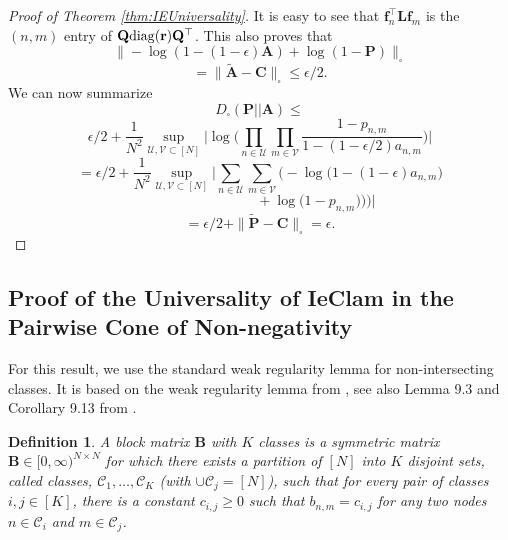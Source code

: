 \documentclass[letterpaper]{article} %
\newtheorem{definition}[theorem]{Definition}
\begin{document}
\begin{proof}[Proof of Theorem \ref{thm:IEUniversality}]
It is easy to see that $\mathbf{f}_n^\top\mathbf{L}\mathbf{f}_m$ is the $(n,m)$ entry of $\mathbf{Q}{\rm diag}(\mathbf{r})\mathbf{Q}^{\top }$. 
This also proves that
\[\|-\log(1-(1-\epsilon)\mathbf{A})+\log(1-\mathbf{P})\|_{\square}\]
\[=\|\tilde{\mathbf{A}}-\mathbf{C}\|_{\square} \leq \epsilon/2.\] 
%
We can now summarize
\[D_{\square}(\mathbf{P}||\mathbf{A}) \leq \]
\[\epsilon/2+\frac{1}{N^2}\sup_{\mathcal{U},\mathcal{V}\subset[N]}\Big|\log\Big(\prod_{n\in \mathcal{U}}\prod_{m\in \mathcal{V}}
\frac{1-p_{n,m}}{1-(1-\epsilon/2)a_{n,m}}\Big)\Big|\]
\[ =
\epsilon/2+\frac{1}{N^2}\sup_{\mathcal{U},\mathcal{V}\subset[N]}\Big|\sum_{n\in \mathcal{U}}\sum_{m\in \mathcal{V}}\Big(-\log\big(1-(1-\epsilon)a_{n,m}\big) \]
\[\quad \quad \quad \quad\quad \quad \quad \quad + \log\big(1-p_{n,m})\big)\Big)\Big|\]
\[=\epsilon/2 + \| \tilde{\mathbf{P}}-\mathbf{C} \|_{\square} = \epsilon. \]
   
\end{proof}


\subsection{Proof of the Universality of IeClam in the Pairwise Cone of Non-negativity}
\label{Proof of the Universality of IeClam in a Cone of Non-negativity}

For this result, we use the standard weak regularity lemma for non-intersecting classes.  It is based on the weak regularity lemma from \cite{weakReg,Szemeredi_analyst}, see also Lemma 9.3 and Corollary 9.13 from \cite{cut-homo3}.

\begin{definition}
    A \emph{block matrix} $\mathbf{B}$ with $K$ classes is a symmetric matrix $\mathbf{B}\in[0,\infty)^{N\times N}$ for which there exists a partition of $[N]$ into $K$ disjoint sets, called \emph{classes}, $\mathcal{C}_1,\ldots,\mathcal{C}_K$ (with $\cup\mathcal{C}_j=[N]$), such that for every pair of classes $i,j\in[K]$, there is a constant $c_{i,j}\geq 0$ such that  $b_{n,m}=c_{i,j}$ for any two nodes $n\in\mathcal{C}_i$ and $m\in\mathcal{C}_j$.
\end{definition}
\end{document}
